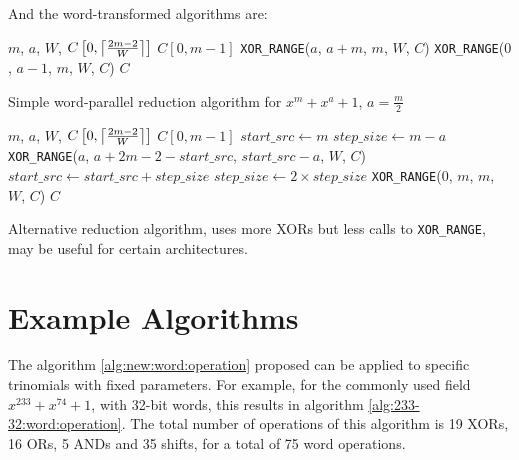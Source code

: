 And the word-transformed algorithms are:

\begin{algorithm}
\begin{algorithmic}[1]
  \REQUIRE $m$, $a$, $W$, $C\left[0,\ceil*{\frac{2m-2}{W}}\right]$
  \ENSURE $C[0,m-1]$
  \STATE \texttt{XOR\_RANGE}($a$, $a+m$, $m$, $W$, $C$)
  \STATE \texttt{XOR\_RANGE}($0$, $a-1$, $m$, $W$, $C$)
  \RETURN $C$
  \caption{Simple word-parallel reduction algorithm for $x^m + x^a +1$, $a = \frac{m}{2}$}
  \label{alg:equallyspaced:word:operation}
\end{algorithmic}
\end{algorithm}

\begin{algorithm}
\begin{algorithmic}[1]
  \REQUIRE $m$, $a$, $W$, $C\left[0,\ceil*{\frac{2m-2}{W}}\right]$
  \ENSURE $C[0,m-1]$
  \STATE $start\_src \gets m$
  \STATE $step\_size \gets m - a$
    \STATE \texttt{XOR\_RANGE}($a$, $a + 2m-2 - start\_src$, $start\_src - a$, $W$, $C$)
    \STATE $start\_src \gets start\_src + step\_size$
    \STATE $step\_size \gets 2 \times step\_size$
  \ENDWHILE
  \STATE \texttt{XOR\_RANGE}($0$, $m$, $m$, $W$, $C$)
  \RETURN $C$
  \caption{Alternative reduction algorithm, uses more XORs but less calls to \texttt{XOR\_RANGE}, may be useful for certain architectures.}
  \label{alg:new:word:operation}
\end{algorithmic}
\end{algorithm}

\section{Example Algorithms}

The algorithm \ref{alg:new:word:operation} proposed can be applied to specific trinomials with fixed parameters. For example, for the commonly used field $x^{233} + x^{74} + 1$, with 32-bit words, this results in algorithm \ref{alg:233-32:word:operation}. The total number of operations of this algorithm is 19 XORs, 16 ORs, 5 ANDs and 35 shifts, for a total of 75 word operations.

